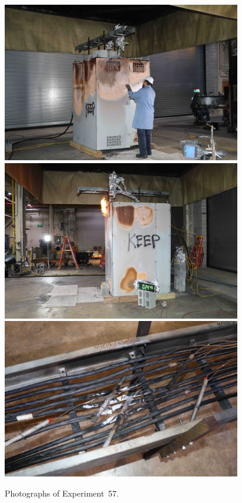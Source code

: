 \begin{figure}[p]
\centering
\includegraphics[height=2.75in]{../FIGURES/Test_57_setup} \\
\includegraphics[height=2.75in]{../FIGURES/Test_57_24_min_46_s} \\
\includegraphics[height=2.75in]{../FIGURES/Test_57_scar}
\caption[Photographs of Experiment~57]{Photographs of Experiment~57.}
\label{fig:Test_57_photos}
\end{figure}


\clearpage

